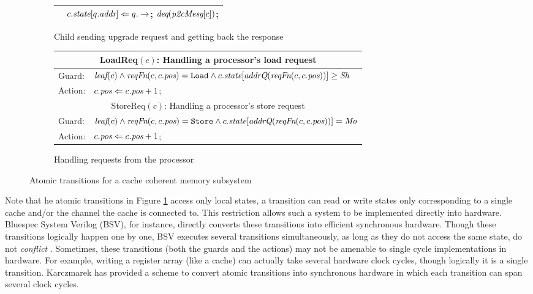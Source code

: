 \begin{figure}
\begin{subfigure}{\textwidth}
\begin{tabular}{|ll|}
& $c.\textit{state}[q.\textit{addr}] \Leftarrow q.\to$; $\textit{deq}(\textit{p2cMesg}[c])$;\\
\hline
\end{tabular}
\caption{Child sending upgrade request and getting back the response}
\end{subfigure}
\begin{subfigure}{\textwidth}
\centering
\begin{tabular}{|ll|}
\hline
\multicolumn{2}{|c|}{LoadReq$(c)$:  Handling a processor's load request}\\
\hline
Guard: & $\textit{leaf}(c) \wedge \textit{reqFn}(c, c.\textit{pos}) = \texttt{Load} \wedge c.\textit{state}[\textit{addrQ}(\textit{reqFn}(c, c.\textit{pos}))] \ge \textit{Sh}$\\
\hline
Action:& $c.\textit{pos} \Leftarrow c.\textit{pos} + 1$;\\
\hline
\hline
\multicolumn{2}{|c|}{StoreReq$(c)$:  Handling a processor's store request}\\
\hline
Guard: & $\textit{leaf}(c) \wedge \textit{reqFn}(c, c.\textit{pos}) = \texttt{Store} \wedge c.\textit{state}[\textit{addrQ}(\textit{reqFn}(c, c.\textit{pos}))] = \textit{Mo}$\\
\hline
Action:& $c.\textit{pos} \Leftarrow c.\textit{pos} + 1$;\\
\hline
\end{tabular}
\caption{Handling requests from the processor}
\end{subfigure}
\caption{Atomic transitions for a cache coherent memory subsystem}
\label{trans}
\end{figure}

Note that he atomic transitions in Figure \ref{trans} access only local states,
\ie a transition can read or write states only corresponding to a single cache
and/or the channel the cache is connected to. This restriction allows such a
system to be implemented directly into hardware. Bluespec System Verilog (BSV),
for instance, directly converts these transitions into efficient synchronous
hardware. Though these transitions logically happen one by one, BSV executes
several transitions simultaneously, as long as they do not access the same
state, \ie do not \emph{conflict} \cite{Hoe:TCAD,HoeArvind:TRSSynthesis1}.
Sometimes, these transitions (both the guards and the actions) may not be
amenable to single cycle implementations in hardware. For example, writing a
register array (like a cache) can actually take several hardware clock cycles,
though logically it is a single transition.  Karczmarek \etal \cite{Karczmarek}
has provided a scheme to convert atomic transitions into synchronous hardware
in which each transition can span several clock cycles.

